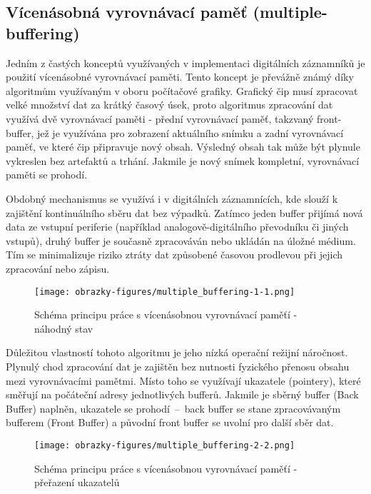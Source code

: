\subsection{Vícenásobná vyrovnávací paměť (multiple-buffering)}
Jedním z častých konceptů využívaných v implementaci digitálních záznamníků je použití vícenásobné vyrovnávací paměti. Tento 
koncept je převážně známý díky algoritmům využívaným v oboru počítačové grafiky. Grafický čip musí zpracovat velké množství dat 
za krátký časový úsek, proto algoritmus zpracování dat využívá dvě vyrovnávací paměti - přední vyrovnávací paměť, takzvaný 
front-buffer, jež je využívána pro zobrazení aktuálního snímku a zadní vyrovnávací paměť, ve které čip připravuje nový obsah. 
Výsledný obsah tak může být plynule vykreslen bez artefaktů a trhání. Jakmile je nový snímek kompletní, vyrovnávací paměti se 
prohodí. \cite{double_buffering_model}

Obdobný mechanismus se využívá i v digitálních záznamnících, kde slouží k zajištění kontinuálního sběru dat bez výpadků. Zatímco 
jeden buffer přijímá nová data ze vstupní periferie (například analogově-digitálního převodníku či jiných vstupů), druhý buffer 
je současně zpracováván nebo ukládán na úložné médium. Tím se minimalizuje riziko ztráty dat způsobené časovou prodlevou při 
jejich zpracování nebo zápisu.

\begin{figure}[h]
    \centering
    \texttt{[image: obrazky-figures/multiple\_buffering-1-1.png]}
    
    \caption{Schéma principu práce s vícenásobnou vyrovnávací paměťí - náhodný stav}
    \label{fig:multiple-buffering-1}
\end{figure}

Důležitou vlastností tohoto algoritmu je jeho nízká operační režijní náročnost. Plynulý chod zpracování dat je zajištěn bez 
nutnosti fyzického přenosu obsahu mezi vyrovnávacími pamětmi. Místo toho se využívají ukazatele (pointery), které směřují na 
počáteční adresy jednotlivých bufferů. Jakmile je sběrný buffer (Back Buffer) naplněn, ukazatele se prohodí~–~back buffer se 
stane zpracovávaným bufferem (Front Buffer) a původní front buffer se uvolní pro další sběr dat.

\begin{figure}[h]
    \centering
    \texttt{[image: obrazky-figures/multiple\_buffering-2-2.png]}
    
    \caption{Schéma principu práce s vícenásobnou vyrovnávací paměťí - přeřazení ukazatelů}
    \label{fig:multiple-buffering-2}
\end{figure}

